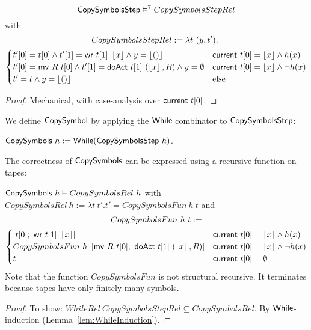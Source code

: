 \begin{lemma}
  \label{lem:CopySymbols_Step_Sem}
  ~
  \[
    \mathsf{CopySymbolsStep} \mathrel{\vDash^{7}} CopySymbolsStepRel
  \]
  with
  \small
  \begin{multline*}
    CopySymbolsStepRel := \lambda t~(y, t').~\\
    \begin{cases}
      t'[0] = t[0]           \land t'[1]=\mathsf{wr}~t[1]~\left\lfloor {x} \right\rfloor         \land y=\left\lfloor {\ensuremath{\mathsf{()}}} \right\rfloor & \mathsf{current}~t[0]=\left\lfloor {x} \right\rfloor \land       h(x) \\
      t'[0] = \mathsf{mv}~R~t[0] \land t'[1]=\mathsf{doAct}~t[1]~(\left\lfloor {x} \right\rfloor, R) \land y=\emptyset      & \mathsf{current}~t[0]=\left\lfloor {x} \right\rfloor \land \lnot h(x) \\
      t' = t \land y=\left\lfloor {\ensuremath{\mathsf{()}}} \right\rfloor                                                           & \text{else}
    \end{cases}
  \end{multline*}
\end{lemma}
\begin{proof}
  Mechanical, with case-analysis over $\mathsf{current}~t[0]$.
\end{proof}

We define $\mathsf{CopySymbol}$ by applying the $\mathsf{While}$ combinator to $\mathsf{CopySymbolsStep}$:
\begin{definition}[$\MS{CopySymbols}$][CopySymbols]
  \label{def:CopySymbols}
  $\mathsf{CopySymbols}~h := \mathsf{While}(\mathsf{CopySymbolsStep}~h)$.
\end{definition}

The correctness of $\MS{CopySymbols}$ can be expressed using a recursive function on tapes:
\begin{lemma}
  \label{lem:CopySymbols_Realise}
  $\mathsf{CopySymbols}~h \mathrel{\vDash} CopySymbolsRel~h$
  with $CopySymbolsRel~h := \lambda t~t'. t' = CopySymbolsFun~h~t$ and
  {
    \small
    \begin{multline*}
      CopySymbolsFun~h~t :=\\
      \begin{cases}
        \left[ t[0];~ \mathsf{wr}~t[1]~\left\lfloor {x} \right\rfloor \right]                                    & \mathsf{current}~t[0]=\left\lfloor {x} \right\rfloor \land h(x) \\
        CopySymbolsFun~h~\left[ \mathsf{mv}~R~t[0];~ \mathsf{doAct}~t[1]~(\left\lfloor {x} \right\rfloor, R) \right] & \mathsf{current}~t[0]=\left\lfloor {x} \right\rfloor \land \lnot h(x) \\
        t                                                                        & \mathsf{current}~t[0]=\emptyset
      \end{cases}
    \end{multline*}
  }
  Note that the function $CopySymbolsFun$ is not structural recursive.  It terminates because tapes have only finitely many symbols.
\end{lemma}
\begin{proof}
  To show: $WhileRel~CopySymbolsStepRel \subseteq CopySymbolsRel$.  By $\mathsf{While}$-induction (Lemma~\ref{lem:WhileInduction}).
\end{proof}

